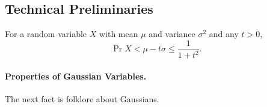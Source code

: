 \documentclass[11pt]{article}
\begin{document}
\subsection{Technical Preliminaries}
\label{sec:prelims}

\begin{fact}
\label{lem:one-sided}
For a random variable $X$ with mean $\mu$ and variance $\sigma^2$ and any $t > 0$,
\[
\Pr{X < \mu - t\sigma} \le \frac{1}{1+t^2}.
\]
\end{fact}

\paragraph{Properties of Gaussian Variables. }
The next fact is folklore about Gaussians.
%
%
%
\end{document}
